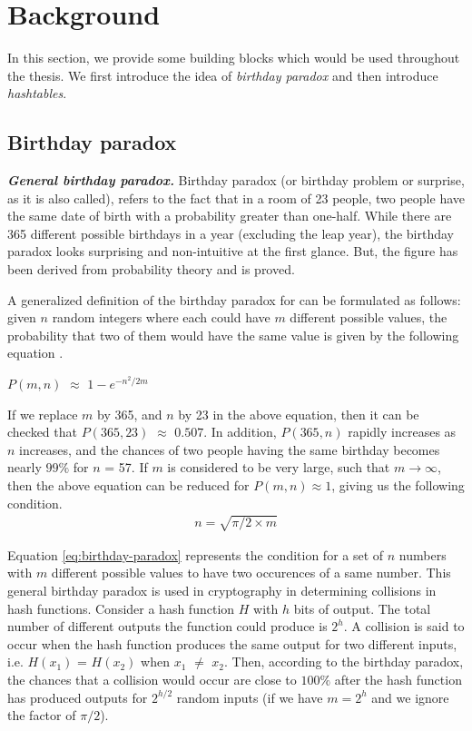 \section{Background}

In this section, we provide some building blocks which would be used throughout the thesis. We first introduce the idea of \textit{birthday paradox} and then introduce \textit{hashtables}.

\subsection{Birthday paradox}
\label{sec:bday-paradox}

\indent \textit{\textbf{General birthday paradox.}} Birthday paradox (or birthday problem or surprise, as it is also called), refers to the fact that in a room of 23 people, two people have the same date of birth with a probability greater than one-half. While there are 365 different possible birthdays in a year (excluding the leap year), the birthday paradox looks surprising and non-intuitive at the first glance. But, the figure has been derived from probability theory and is proved. 

A generalized definition of the birthday paradox for can be formulated as follows: given $n$ random integers where each could have $m$ different possible values, the probability that two of them would have the same value is given by the following equation \cite{menezes}.
\begin{center}
$P(m,n)$ $\approx$ $1 - e^{-{n^2}/{2m}}$
\end{center}
If we replace $m$ by 365, and $n$ by 23 in the above equation, then it can be checked that $P(365,23)$ $\approx$ $0.507$. In addition, $P(365,n)$ rapidly increases as $n$ increases, and the chances of two people having the same birthday becomes nearly $99 \%$ for $n$ = 57. If $m$ is considered to be very large, such that $m \rightarrow \infty$, then the above equation can be reduced for $P(m,n) \approx 1$, giving us the following condition. 
\begin{align}
\label{eq:birthday-paradox} n = \sqrt{\pi/2 \times m}
\end{align}

Equation \ref{eq:birthday-paradox} represents the condition for a set of $n$ numbers with $m$ different possible values to have two occurences of a same number. This general birthday paradox is used in cryptography in determining collisions in hash functions. Consider a hash function $H$ with $h$ bits of output. The total number of different outputs the function could produce is $2^{h}$. A collision is said to occur when the hash function produces the same output for two different inputs, i.e. $H(x_1)$ = $H(x_2)$ when $x_1$ $\neq$ $x_2$. Then, according to the birthday paradox, the chances that a collision would occur are close to $100 \%$ after the hash function has produced outputs for $2^{h/2}$ random inputs (if we have $m = 2^h$ and we ignore the factor of $\pi/2$).\\

